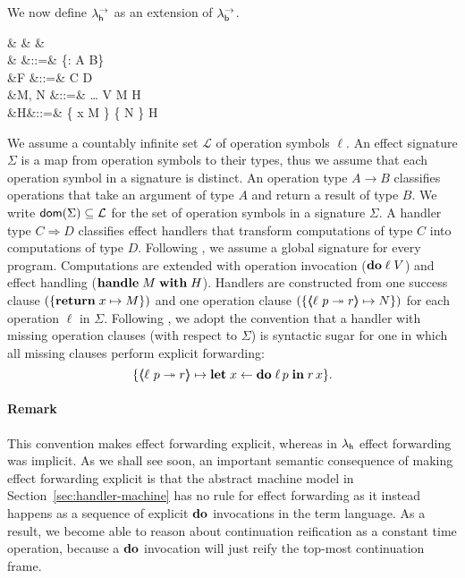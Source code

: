 \documentclass[12pt,phd,lfcs,twoside,openright,logo,leftchapter,normalheadings]{infthesis}
\theoremstyle{plain}
\theoremstyle{definition}
\begin{document}
We now define $\lambda^\rightarrow_{\mathsf{h}}$ as an extension of $\lambda^\rightarrow_{\mathsf{b}}$.
%
{
\begin{syntax}
 &\ell \in {} & & \\
        &\Sigma\in{} &::=& \cdot \mid \{\ell : A \to B\} \cup \Sigma\\
     &F \in \HandlerTypeCat    &::=& C \Rightarrow D\\
 &M, N \in \CompCat &::=& \dots \mid \Do \; \ell \; V
                          \mid  \Handle \; M \; \With \; H \\
     &H&::=& \{ \Return \; x \mapsto M \}
                      \mid  \{  \mapsto N \} \uplus H\\
\end{syntax}}%
%
We assume a countably infinite set $\mathcal{L}$ of operation symbols
$\ell$.
%
An effect signature $\Sigma$ is a map from operation symbols to their
types, thus we assume that each operation symbol in a signature is
distinct. An operation type $A \to B$ classifies operations that take
an argument of type $A$ and return a result of type $B$.
%
We write $\mathsf{dom}(\Sigma) \subseteq \mathcal{L}$ for the set of operation
symbols in a signature $\Sigma$.
%
A handler type $C \Rightarrow D$ classifies effect handlers that
transform computations of type $C$ into computations of type $D$.
%
Following \citet{Pretnar15}, we assume a global signature for every
program.
%
Computations are extended with operation invocation ($\mathbf{do}\;\ell\;V$)
and effect handling ($\mathbf{handle}\; M \;\mathbf{with}\; H$).
%
Handlers are constructed from one success clause $(\{\mathbf{return}\; x \mapsto
M\})$ and one operation clause $(\{ \langle\!\!\langle \ell~p \twoheadrightarrow r \rangle\!\!\rangle \mapsto N \})$ for
each operation $\ell$ in $\Sigma$.
%
Following \citet{PlotkinP13}, we adopt the convention that a handler
with missing operation clauses (with respect to $\Sigma$) is syntactic
sugar for one in which all missing clauses perform explicit
forwarding:
%
\[
   \{\langle\!\!\langle \ell~p \twoheadrightarrow r \rangle\!\!\rangle \mapsto \mathbf{let}\; x \leftarrow \mathbf{do} \; \ell \, p \;\mathbf{in}\; r \, x\}.
\]
%
\paragraph{Remark}
  This convention makes effect forwarding explicit, whereas in
  $\lambda_{\mathsf{h}}$ effect forwarding was implicit. As we shall see soon, an
  important semantic consequence of making effect forwarding explicit
  is that the abstract machine model in
  Section~\ref{sec:handler-machine} has no rule for effect forwarding
  as it instead happens as a sequence of explicit $\mathbf{do}$ invocations in
  the term language. As a result, we become able to reason about
  continuation reification as a constant time operation, because a
  $\mathbf{do}$ invocation will just reify the top-most continuation frame.\medskip
\end{document}
